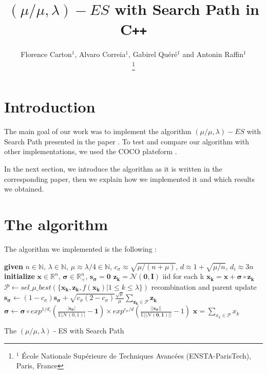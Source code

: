 \documentclass[transmag]{IEEEtran}
\def\CPP{C\texttt{++}}
\begin{document}
\title{$(\mu/\mu,\lambda)-ES$ with Search Path in \CPP}


\author{%
Florence Carton$^{1}$, Alvaro Correia$^{1}$, Gabirel Quéré$^{1}$ and Antonin Raffin$^{1}$%

\thanks{$^{1}$ \'Ecole Nationale Sup\'erieure de Techniques Avanc\'ees (ENSTA-ParisTech), Paris, France}%
}


\maketitle


\begin{abstract}

\end{abstract}

\IEEEpeerreviewmaketitle


\section{Introduction}


The main goal of our work was to implement the algorithm $(\mu/\mu,\lambda)-ES$  with Search Path presented in the paper \cite{algo}. To test and compare our algorithm with other implementations, we used the COCO plateform \cite{coco}. 

In the next section, we introduce the algorithm as it is written in the corresponding paper, then we explain how we implemented it and which results we obtained. 

\section{The algorithm}

The algorithm we implemented is the following : 

\begin{algorithm}
\begin{algorithmic}[1]
\State \textbf{given} $n \in \mathbb{N}$, $\lambda \in \mathbb{N}$, $\mu \approx \lambda/4 \in \mathbb{N}$,  $c_{\sigma} \approx \sqrt{\mu /(n+\mu)}$, $ d \approx 1 + \sqrt{\mu/n}$, $d_i \approx 3n$
\State \textbf{initialize} $\bm{x} \in \mathbb{R}^n $, $\bm{\sigma} \in \mathbb{R}^n _+ $, $\bm{s_{\sigma}} =\bm{0}$
    	\State $\bm{z_k} = \mathcal{N}(\bm{0}, \bm{I})$  iid for each k
    	\State $ \bm{x_k} = \bm{x} + \bm{\sigma} \circ \bm{z_k}$
	\EndFor
    \State $\mathcal{P} \leftarrow sel\_\mu\_best(\{\bm{x_k}, \bm{z_k}, f(\bm{x_k})|1\leq k \leq \lambda \})$ recombination and parent update
    \State $\bm{s_{\sigma}} \leftarrow (1 - c_{\sigma})\bm{s_{\sigma}} + \sqrt{c_{\sigma}(2-c_{\sigma})}\frac{\sqrt{\mu}}{\mu}\sum_{\bm{z_k}\in \mathcal{P}}\bm{z_k} $
    \State $\bm{\sigma} \leftarrow \bm{\sigma} \circ exp^{1/d_i}(\frac{|\bm{s_{\sigma}}|}{\mathbb{E}|\mathcal{N}(0,1)|}-\bm{1}) \times exp^{c_{\sigma}/d}(\frac{||\bm{s_{\sigma}}||}{\mathbb{E}||\mathcal{N}(\bm{0},\bm{1})||}-1) $
    \State $ \bm{x} = \sum_{x_k \in \mathcal{P}} x_k$
\EndWhile
\end{algorithmic}
 \caption{The $(\mu / \mu, \lambda)$ - ES with Search Path}
\end{algorithm}
\end{document}
